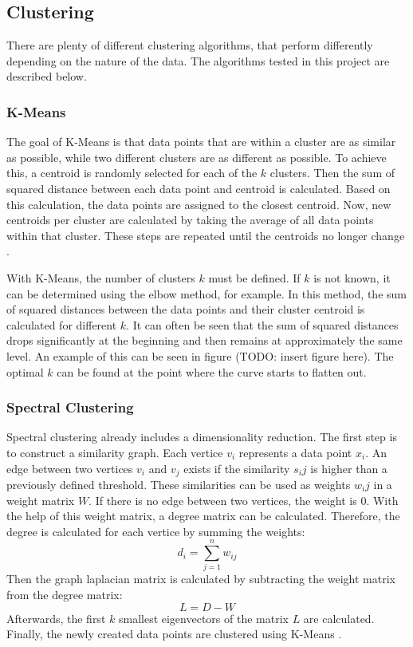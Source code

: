 \subsection{Clustering}
There are plenty of different clustering algorithms, that perform differently depending on the nature of the data.
The algorithms tested in this project are described below.

\subsubsection{K-Means}
The goal of K-Means is that data points that are within a cluster are as similar as possible, while two different clusters are as different as possible.
To achieve this, a centroid is randomly selected for each of the $k$ clusters.
Then the sum of squared distance between each data point and centroid is calculated.
Based on this calculation, the data points are assigned to the closest centroid.
Now, new centroids per cluster are calculated by taking the average of all data points within that cluster.
These steps are repeated until the centroids no longer change \cite{kmeans}.

With K-Means, the number of clusters $k$ must be defined. If $k$ is not known, it can be determined using the elbow method, for example.
In this method, the sum of squared distances between the data points and their cluster centroid is calculated for different $k$.
It can often be seen that the sum of squared distances drops significantly at the beginning and then remains at approximately the same level.
An example of this can be seen in figure (TODO: insert figure here).
The optimal $k$ can be found at the point where the curve starts to flatten out\cite{kmeans}.

\subsubsection{Spectral Clustering}
Spectral clustering already includes a dimensionality reduction.
The first step is to construct a similarity graph.
Each vertice $v_i$ represents a data point $x_i$.
An edge between two vertices $v_i$ and $v_j$ exists if the similarity $s_ij$ is higher than a previously defined threshold.
These similarities can be used as weights $w_ij$ in a weight matrix $W$.
If there is no edge between two vertices, the weight is $0$.
With the help of this weight matrix, a degree matrix can be calculated.
Therefore, the degree is calculated for each vertice by summing the weights:
$$
d_i = \sum_{j=1}^n{w_{ij}}
$$
Then the graph laplacian matrix is calculated by subtracting the weight matrix from the degree matrix:
$$
L = D - W
$$
Afterwards, the first $k$ smallest eigenvectors of the matrix $L$ are calculated.
Finally, the newly created data points are clustered using K-Means \cite{spectral_clustering}.

